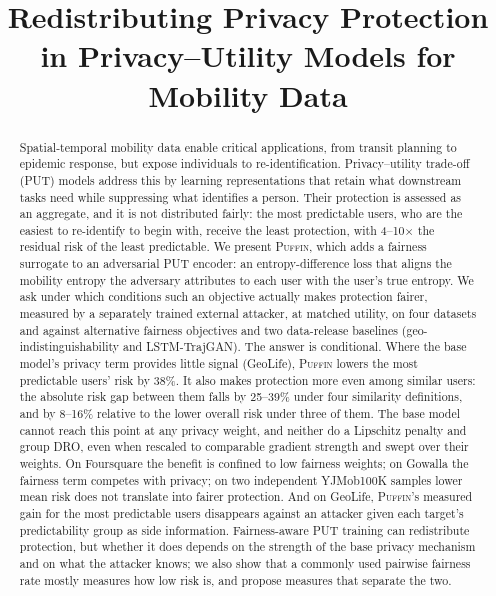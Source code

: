 \documentclass[sigconf,anonymous,review]{acmart}
\newcommand{\puffin}{\textsc{Puffin}}
\begin{document}
\title[Redistributing Privacy Protection in Mobility PUT Models]{Redistributing Privacy Protection in Privacy--Utility Models for Mobility Data}

\begin{abstract}
Spatial-temporal mobility data enable critical applications, from transit planning to epidemic response, but expose individuals to re-identification. Privacy--utility trade-off (PUT) models address this by learning representations that retain what downstream tasks need while suppressing what identifies a person. Their protection is assessed as an aggregate, and it is not distributed fairly: the most predictable users, who are the easiest to re-identify to begin with, receive the least protection, with 4--10$\times$ the residual risk of the least predictable. We present \puffin, which adds a fairness surrogate to an adversarial PUT encoder: an entropy-difference loss that aligns the mobility entropy the adversary attributes to each user with the user's true entropy. We ask under which conditions such an objective actually makes protection fairer, measured by a separately trained external attacker, at matched utility, on four datasets and against alternative fairness objectives and two data-release baselines (geo-indistinguishability and LSTM-TrajGAN). The answer is conditional. Where the base model's privacy term provides little signal (GeoLife), \puffin{} lowers the most predictable users' risk by 38\%. It also makes protection more even among similar users: the absolute risk gap between them falls by 25--39\% under four similarity definitions, and by 8--16\% relative to the lower overall risk under three of them. The base model cannot reach this point at any privacy weight, and neither do a Lipschitz penalty and group DRO, even when rescaled to comparable gradient strength and swept over their weights. On Foursquare the benefit is confined to low fairness weights; on Gowalla the fairness term competes with privacy; on two independent YJMob100K samples lower mean risk does not translate into fairer protection. And on GeoLife, \puffin's measured gain for the most predictable users disappears against an attacker given each target's predictability group as side information. Fairness-aware PUT training can redistribute protection, but whether it does depends on the strength of the base privacy mechanism and on what the attacker knows; we also show that a commonly used pairwise fairness rate mostly measures how low risk is, and propose measures that separate the two.
\end{abstract}
\end{document}
